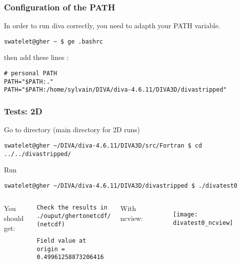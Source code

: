 \begin{frame}[fragile]
\frametitle{Configuration of the PATH}

In order to run diva correctly, you need to adapth your PATH variable.

\begin{lstlisting}[style=Bash]
swatelet@gher ~ $ ge .bashrc
\end{lstlisting}

then add these lines :

{\tiny
\begin{verbatim}
# personal PATH
PATH="$PATH:."
PATH="$PATH:/home/sylvain/DIVA/diva-4.6.11/DIVA3D/divastripped"
\end{verbatim}
}

\end{frame}

\begin{frame}[fragile]
\frametitle{Tests: 2D}
\footnotesize

Go to directory  (main directory for 2D runs)
\begin{lstlisting}[style=Bash]
swatelet@gher ~/DIVA/diva-4.6.11/DIVA3D/src/Fortran $ cd ../../divastripped/
\end{lstlisting}

Run  \Coffeecup
\begin{lstlisting}[style=Bash]
swatelet@gher ~/DIVA/diva-4.6.11/DIVA3D/divastripped $ ./divatest0
\end{lstlisting}

\begin{columns}[totalwidth=\textwidth]
You should get:

{\tiny
\begin{verbatim}
Check the results in
./ouput/ghertonetcdf/results.nc (netcdf)
 
Field value at origin =  0.49961258873206416
\end{verbatim}
}
With ncview:

\begin{figure}
\texttt{[image: divatest0\_ncview]}
\end{figure}

\end{columns}

\end{frame}

